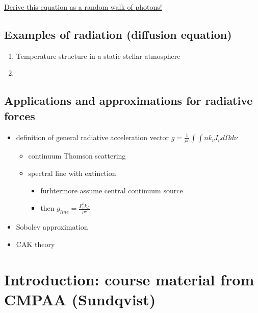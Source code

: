 \documentclass[10pt,a4paper]{article}
\begin{document}
\underline{Derive this equation as a random walk of photons!}

\subsection{Examples of radiation (diffusion equation)}
\begin{enumerate}
\item Temperature structure in a static stellar atmosphere
\item 
\end{enumerate}

\subsection{Applications and approximations for radiative forces}
\begin{itemize}
\item definition of general radiative acceleration vector $g = \frac{1}{\rho c}\int \int n k_{\nu} I_{\nu} d\Omega d\nu$
\begin{itemize}
\item continuum Thomson scattering
\item spectral line with extinction
\begin{itemize}
\item furhtermore assume central continuum source
\item then $g_{line} = \frac{F_{\nu}^0 k_L}{\rho c}$
\end{itemize}
\end{itemize}

\item Sobolev approximation
\item CAK theory
\end{itemize}

\newpage
\section{Introduction: course material from CMPAA (Sundqvist)}
\end{document}

